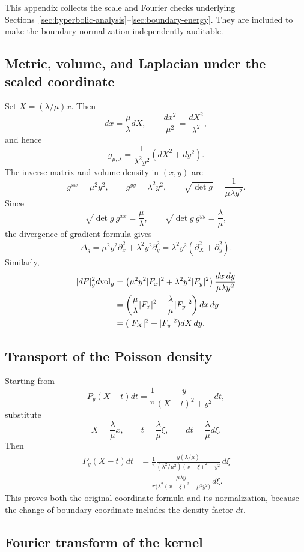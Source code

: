 This appendix collects the scale and Fourier checks underlying
Sections~\ref{sec:hyperbolic-analysis}--\ref{sec:boundary-energy}.  They are
included to make the boundary normalization independently auditable.

\subsection{Metric, volume, and Laplacian under the scaled coordinate}

Set $X=(\lambda/\mu)x$.  Then
\[
 dx=\frac{\mu}{\lambda}dX,
 \qquad
 \frac{dx^2}{\mu^2}=\frac{dX^2}{\lambda^2},
\]
and hence
\[
 g_{\mu,\lambda}
 =\frac1{\lambda^2y^2}(dX^2+dy^2).
\]
The inverse matrix and volume density in $(x,y)$ are
\[
 g^{xx}=\mu^2y^2,
 \qquad
 g^{yy}=\lambda^2y^2,
 \qquad
 \sqrt{\det g}=\frac1{\mu\lambda y^2}.
\]
Since
\[
 \sqrt{\det g}\,g^{xx}=\frac\mu\lambda,
 \qquad
 \sqrt{\det g}\,g^{yy}=\frac\lambda\mu,
\]
the divergence-of-gradient formula gives
\[
 \Delta_g
 =\mu^2y^2\partial_x^2+\lambda^2y^2\partial_y^2
 =\lambda^2y^2(\partial_X^2+\partial_y^2).
\]
Similarly,
\begin{align*}
 |dF|_g^2d\mathrm{vol}_g
 &=\left(\mu^2y^2|F_x|^2+\lambda^2y^2|F_y|^2\right)
   \frac{dx\,dy}{\mu\lambda y^2}\\
 &=\left(\frac\mu\lambda|F_x|^2
         +\frac\lambda\mu|F_y|^2\right)dx\,dy\\
 &=(|F_X|^2+|F_y|^2)dX\,dy.
\end{align*}

\subsection{Transport of the Poisson density}

Starting from
\[
 P_y(X-t)dt=\frac1\pi\frac{y}{(X-t)^2+y^2}\,dt,
\]
substitute
\[
 X=\frac\lambda\mu x,
 \qquad
 t=\frac\lambda\mu\xi,
 \qquad
 dt=\frac\lambda\mu d\xi.
\]
Then
\begin{align*}
 P_y(X-t)dt
 &=\frac1\pi
   \frac{y(\lambda/\mu)}
   {(\lambda^2/\mu^2)(x-\xi)^2+y^2}\,d\xi\\
 &=\frac{\mu\lambda y}
   {\pi\bigl(\lambda^2(x-\xi)^2+\mu^2y^2\bigr)}\,d\xi.
\end{align*}
This proves both the original-coordinate formula and its normalization, because
the change of boundary coordinate includes the density factor $dt$.

\subsection{Fourier transform of the kernel}

